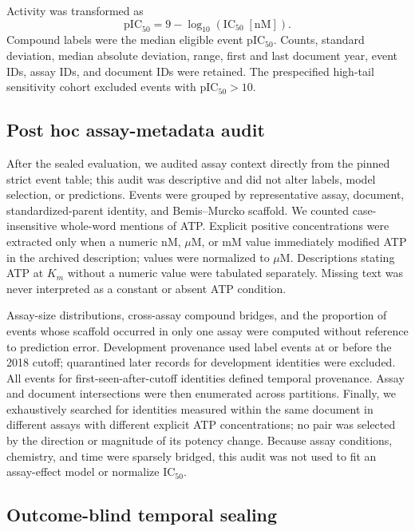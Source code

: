 \documentclass[11pt]{article}
\begin{document}
Activity was transformed as
\[
  \mathrm{pIC}_{50}=9-\log_{10}(\mathrm{IC}_{50}\;[\mathrm{nM}]).
\]
Compound labels were the median eligible event pIC$_{50}$. Counts, standard
deviation, median absolute deviation, range, first and last document year, event
IDs, assay IDs, and document IDs were retained. The prespecified high-tail
sensitivity cohort excluded events with pIC$_{50}>10$.

\subsection{Post hoc assay-metadata audit}

After the sealed evaluation, we audited assay context directly from the pinned
strict event table; this audit was descriptive and did not alter labels, model
selection, or predictions. Events were grouped by representative assay,
document, standardized-parent identity, and Bemis--Murcko scaffold. We counted
case-insensitive whole-word mentions of ATP. Explicit positive concentrations
were extracted only when a numeric nM, $\mu$M, or mM value immediately modified
ATP in the archived description; values were normalized to $\mu$M. Descriptions
stating ATP at $K_m$ without a numeric value were tabulated separately. Missing
text was never interpreted as a constant or absent ATP condition.

Assay-size distributions, cross-assay compound bridges, and the proportion of
events whose scaffold occurred in only one assay were computed without reference
to prediction error. Development provenance used label events at or before the
2018 cutoff; quarantined later records for development identities were excluded.
All events for first-seen-after-cutoff identities defined temporal provenance.
Assay and document intersections were then enumerated across partitions. Finally,
we exhaustively searched for identities measured within the same document in
different assays with different explicit ATP concentrations; no pair was selected
by the direction or magnitude of its potency change. Because assay conditions,
chemistry, and time were sparsely bridged, this audit was not used to fit an
assay-effect model or normalize IC$_{50}$.

\subsection{Outcome-blind temporal sealing}
\end{document}
